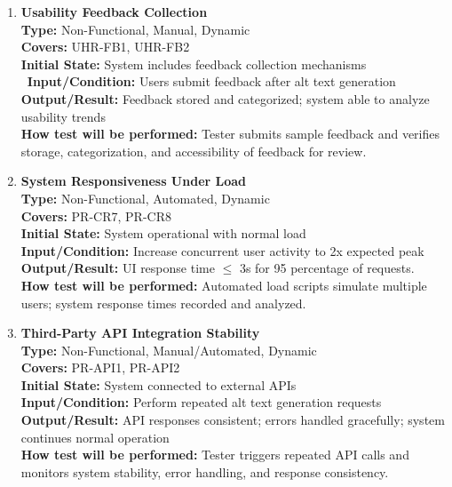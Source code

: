 \documentclass[12pt, titlepage]{article}
\begin{document}
\begin{enumerate}[label=NFR-ST \arabic*., wide=0pt, leftmargin=*]
  \item \textbf{Usability Feedback Collection} \\[2mm]
    \textbf{Type:} Non-Functional, Manual, Dynamic \\
    \textbf{Covers:} UHR-FB1, UHR-FB2 \\
    \textbf{Initial State:} System includes feedback collection mechanisms \
    \textbf{Input/Condition:} Users submit feedback after alt text generation \\
    \textbf{Output/Result:} Feedback stored and categorized; system
    able to analyze usability trends \\[2mm]
    \textbf{How test will be performed:} Tester submits sample
    feedback and verifies storage, categorization, and accessibility
    of feedback for review.

  \item \textbf{System Responsiveness Under Load} \\[2mm]
    \textbf{Type:} Non-Functional, Automated, Dynamic \\
    \textbf{Covers:} PR-CR7, PR-CR8 \\
    \textbf{Initial State:} System operational with normal load \\
    \textbf{Input/Condition:} Increase concurrent user activity to 2x
    expected peak \\
    \textbf{Output/Result:} UI response time $\le$ 3s for 95
    percentage of requests. \\[2mm]
    \textbf{How test will be performed:} Automated load scripts
    simulate multiple users; system response times recorded and analyzed.

  \item \textbf{Third-Party API Integration Stability} \\[2mm]
    \textbf{Type:} Non-Functional, Manual/Automated, Dynamic \\
    \textbf{Covers:} PR-API1, PR-API2 \\
    \textbf{Initial State:} System connected to external APIs \\
    \textbf{Input/Condition:} Perform repeated alt text generation requests \\
    \textbf{Output/Result:} API responses consistent; errors handled
    gracefully; system continues normal operation \\[2mm]
    \textbf{How test will be performed:} Tester triggers repeated API
    calls and monitors system stability, error handling, and response
    consistency.


\end{enumerate}
\end{document}
